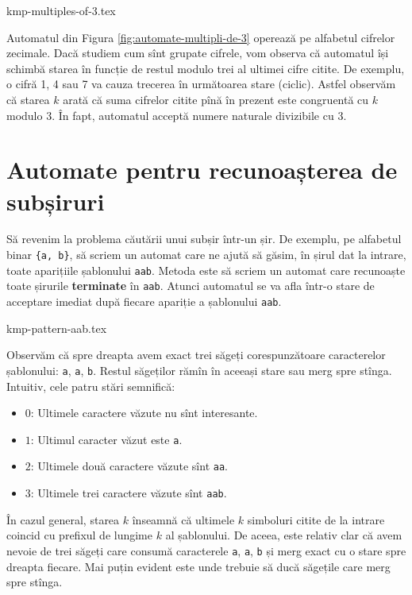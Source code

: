 \documentclass[../main.tex]{subfiles}
\begin{document}
{kmp-multiples-of-3.tex}

Automatul din Figura \ref{fig:automate-multipli-de-3} operează pe alfabetul
cifrelor zecimale. Dacă studiem cum sînt grupate cifrele, vom observa că
automatul își schimbă starea în funcție de restul modulo trei al ultimei cifre
citite. De exemplu, o cifră 1, 4 sau 7 va cauza trecerea în următoarea stare
(ciclic). Astfel observăm că starea $k$ arată că suma cifrelor citite pînă în
prezent este congruentă cu $k$ modulo 3. În fapt, automatul acceptă numere
naturale divizibile cu 3.


\section{Automate pentru recunoașterea de subșiruri}

Să revenim la problema căutării unui subșir într-un șir. De exemplu, pe
alfabetul binar \texttt{\{a, b\}}, să scriem un automat care ne ajută să
găsim, în șirul dat la intrare, toate aparițiile șablonului \texttt{aab}.
Metoda este să scriem un automat care recunoaște toate șirurile
\textbf{terminate} în \texttt{aab}. Atunci automatul se va afla într-o stare
de acceptare imediat după fiecare apariție a șablonului \texttt{aab}.

{kmp-pattern-aab.tex}

Observăm că spre dreapta avem exact trei săgeți corespunzătoare caracterelor
șablonului: \texttt{a}, \texttt{a}, \texttt{b}. Restul săgeților rămîn în
aceeași stare sau merg spre stînga. Intuitiv, cele patru stări semnifică:

\begin{itemize}
\item $0$: Ultimele caractere văzute nu sînt interesante.
\item $1$: Ultimul caracter văzut este \texttt{a}.
\item $2$: Ultimele două caractere văzute sînt \texttt{aa}.
\item $3$: Ultimele trei caractere văzute sînt \texttt{aab}.
\end{itemize}

În cazul general, starea $k$ înseamnă că ultimele $k$ simboluri citite de la
intrare coincid cu prefixul de lungime $k$ al șablonului. De aceea, este
relativ clar că avem nevoie de trei săgeți care consumă caracterele
\texttt{a}, \texttt{a}, \texttt{b} și merg exact cu o stare spre dreapta
fiecare. Mai puțin evident este unde trebuie să ducă săgețile care merg spre
stînga.
\end{document}
